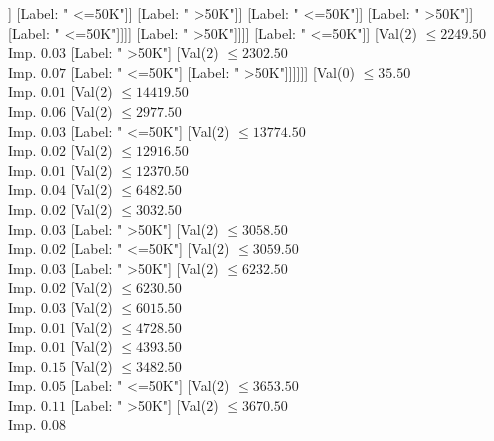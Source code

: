 \documentclass[margin=10pt]{standalone}
\begin{document}
\begin{forest}
																				[Val($2$) $ \leq 1791.50$ \\ Imp. $0.05$
																					[Label: " >50K"]
																					[Label: " <=50K"]]
																				[Label: " <=50K"]]
																			[Label: " >50K"]]
																		[Label: " <=50K"]]
																	[Label: " >50K"]]
																[Label: " <=50K"]]]]
													[Label: " >50K"]]]]
										[Label: " <=50K"]]
									[Val($2$) $ \leq 2249.50$ \\ Imp. $0.03$
										[Label: " >50K"]
										[Val($2$) $ \leq 2302.50$ \\ Imp. $0.07$
											[Label: " <=50K"]
											[Label: " >50K"]]]]]]
						[Val($0$) $ \leq 35.50$ \\ Imp. $0.01$
							[Val($2$) $ \leq 14419.50$ \\ Imp. $0.06$
								[Val($2$) $ \leq 2977.50$ \\ Imp. $0.03$
									[Label: " <=50K"]
									[Val($2$) $ \leq 13774.50$ \\ Imp. $0.02$
										[Val($2$) $ \leq 12916.50$ \\ Imp. $0.01$
											[Val($2$) $ \leq 12370.50$ \\ Imp. $0.04$
												[Val($2$) $ \leq 6482.50$ \\ Imp. $0.02$
													[Val($2$) $ \leq 3032.50$ \\ Imp. $0.03$
														[Label: " >50K"]
														[Val($2$) $ \leq 3058.50$ \\ Imp. $0.02$
															[Label: " <=50K"]
															[Val($2$) $ \leq 3059.50$ \\ Imp. $0.03$
																[Label: " >50K"]
																[Val($2$) $ \leq 6232.50$ \\ Imp. $0.02$
																	[Val($2$) $ \leq 6230.50$ \\ Imp. $0.03$
																		[Val($2$) $ \leq 6015.50$ \\ Imp. $0.01$
																			[Val($2$) $ \leq 4728.50$ \\ Imp. $0.01$
																				[Val($2$) $ \leq 4393.50$ \\ Imp. $0.15$
																					[Val($2$) $ \leq 3482.50$ \\ Imp. $0.05$
																						[Label: " <=50K"]
																						[Val($2$) $ \leq 3653.50$ \\ Imp. $0.11$
																							[Label: " >50K"]
																							[Val($2$) $ \leq 3670.50$ \\ Imp. $0.08$

\end{forest}
\end{document}
